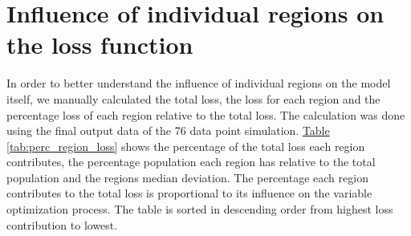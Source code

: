 

\section{Influence of individual regions on the loss function}
In order to better understand the influence of individual regions on the model itself, we manually calculated the total
loss, the loss for each region and the percentage loss of each region relative to the total loss. The
calculation was done using the final output data of the 76 data point simulation.
\hyperref[tab:perc_region_loss]{Table \ref*{tab:perc_region_loss}} shows the percentage of the total loss each region
contributes, the percentage population each region has relative to the total population and the regions median deviation.
The percentage each region contributes to the total loss is proportional to its influence on the variable optimization process.
The table is sorted in descending order from highest loss contribution to lowest.\newline

